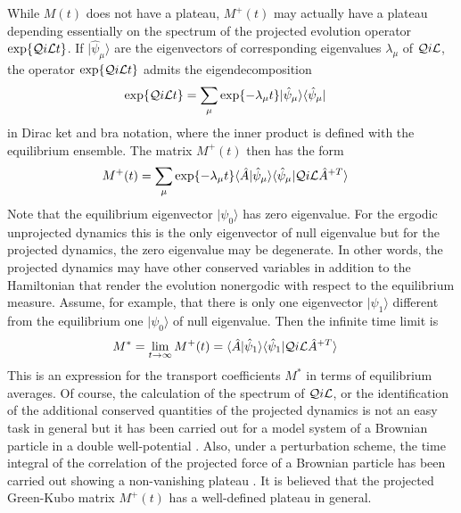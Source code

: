 \documentclass[b5paper,openright,10pt]{book}
\begin{document}
While $M(t)$  does not have  a plateau,  $M^+(t)$ may actually  have a
plateau  depending  essentially  on  the  spectrum  of  the  projected
evolution     operator    $\exp\{{\cal     Q}i{\cal    L}t\}$.      If
$|\hat{\psi}_\mu\rangle$  are  the   eigenvectors  of  corresponding
eigenvalues  $\lambda_\mu$  of  ${\cal   Q}i{\cal  L}$,  the  operator
$\exp\{{\cal Q}i{\cal L}t\}$ admits the eigendecomposition
\begin{align}
  \exp\{{\cal Q}i{\cal L}t\}&=\sum_\mu \exp\{-\lambda_\mu t\}|\hat{\psi}_\mu\rangle\langle\hat{\psi}_\mu|
\end{align}
in Dirac ket and bra notation, where the inner product is defined with
the equilibrium ensemble.  The matrix $M^+(t)$ then has the form
\begin{align}
  M^+(t)&=
\sum_\mu \exp\{-\lambda_\mu t\} \langle \hat{A}|\hat{\psi}_\mu\rangle
\langle\hat{\psi}_\mu|{\cal Q}i{\cal L}\hat{A}^{+T} \rangle
\end{align}
Note  that  the  equilibrium  eigenvector  $|\psi_0\rangle$  has  zero
eigenvalue.  For  the ergodic  unprojected dynamics  this is  the only
eigenvector of  null eigenvalue  but for  the projected  dynamics, the
zero  eigenvalue may  be  degenerate. In  other  words, the  projected
dynamics  may  have  other  conserved variables  in  addition  to  the
Hamiltonian that render the evolution  nonergodic with respect to the
equilibrium  measure.  Assume,  for  example, that  there  is only  one
eigenvector  $|\psi_1\rangle$  different   from  the  equilibrium  one
$|\psi_0\rangle$ of null eigenvalue. Then the infinite time limit is
\begin{align}
M^*&=\lim_{t\to\infty}  M^+(t)=\langle \hat{A}|\hat{\psi}_1\rangle
\langle\hat{\psi}_1|{\cal Q}i{\cal L}\hat{A}^{+T} \rangle
\end{align}
This is an expression for the transport coefficients $M^*$ in terms of
equilibrium averages.  Of  course, the calculation of  the spectrum of
${\cal Q}i{\cal L}$, or the identification of the additional conserved
quantities of  the projected dynamics is  not an easy task  in general
but it has been carried out for  a model system of a Brownian particle
in a  double well-potential \cite{Wu1989}. Also,  under a perturbation
scheme, the time integral of the correlation of the projected force of
a  Brownian particle  has  been carried  out  showing a  non-vanishing
plateau  \cite{Mazur1970}.    It  is   believed  that   the  projected
Green-Kubo matrix $M^+(t)$ has a well-defined plateau in general.
\end{document}
